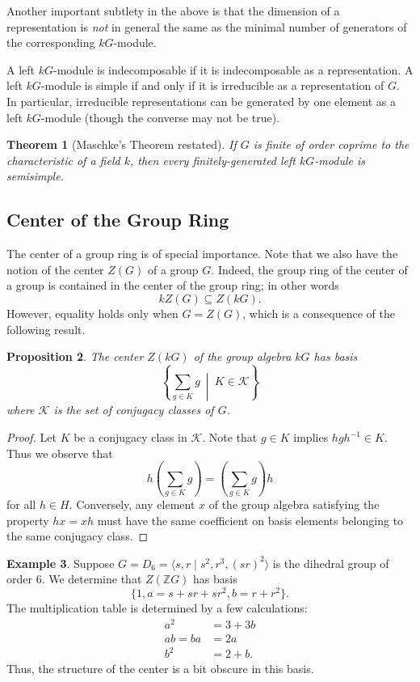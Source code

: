 \documentclass[12pt]{article}
\theoremstyle{plain}
\newtheorem{theorem}{Theorem}[section]
\newtheorem{proposition}[theorem]{Proposition}
\theoremstyle{definition}
\newtheorem{example}[theorem]{Example}
\theoremstyle{remark}
\numberwithin{equation}{section}
\begin{document}
Another important subtlety in the above is that the dimension of a
representation is \emph{not} in general the same as the minimal number
of generators of the corresponding $kG$-module.

A left $kG$-module is indecomposable if it is indecomposable as a
representation.
A left $kG$-module is simple if and only if it is irreducible
as a representation of $G$.
In particular, irreducible representations can be
generated by one element as a left $kG$-module (though the converse may not
be true).

\begin{theorem}[Maschke's Theorem restated]
If $G$ is finite of order coprime to the characteristic of a field $k$,
then every finitely-generated left $kG$-module is semisimple.
\end{theorem}

\subsection{Center of the Group Ring}

The center of a group ring is of special importance.
Note that we also have the notion of the center $Z(G)$ of a group $G$.
Indeed, the group ring of the center of a group is contained in the
center of the group ring; in other words
\[
kZ(G) \subseteq Z(kG).
\]
However, equality holds only when $G=Z(G)$, which is a consequence of the
following result.

\begin{proposition}
The center $Z(kG)$ of the group algebra $kG$ has basis
\[
\left\{
\sum_{g \in K} g\ \middle|\ K \in \mathcal{K}
\right\}
\]
where $\mathcal{K}$ is the set of conjugacy classes of $G$.
\end{proposition}

\begin{proof}
Let $K$ be a conjugacy class in $\mathcal{K}$.
Note that $g \in K$ implies
$hgh^{-1} \in K$.
Thus we observe that
\[
h\left(\sum_{g \in K} g\right)
=\left(\sum_{g \in K} g\right) h
\]
for all $h \in H$. 
Conversely, any element $x$ of the group algebra
satisfying the property $hx=xh$ must have the same coefficient
on basis elements belonging to the same conjugacy class.
\end{proof}

\begin{example}
Suppose $G=D_6=\langle s,r \mid s^2, r^3, (sr)^2 \rangle$
is the dihedral group of order $6$.
We determine that
$Z(\mathbb{Z}G)$ has basis
\[
\{ 1, a = s+sr+sr^2, b = r+r^2 \}.
\]
The multiplication table is determined by a few calculations:
\begin{align*}
a^2 &= 3+3b\\
ab=ba &= 2a\\
b^2 &=2+b.
\end{align*}
Thus, the structure of the center is a bit obscure in this basis.
\end{example}
\end{document}
